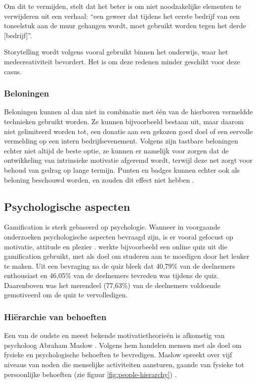 Om dit te vermijden, stelt \textcite{Duster1990} dat het beter is om niet noodzakelijke elementen te verwijderen uit een verhaal: ``een geweer dat tijdens het eerste bedrijf van een toneelstuk aan de muur gehangen wordt, moet gebruikt worden tegen het derde [bedrijf]''.

Storytelling wordt volgens \textcite{Schmoelz2018} vooral gebruikt binnen het onderwijs, waar het medecreativiteit bevordert. Het is om deze redenen minder geschikt voor deze casus.


\subsubsection{Beloningen}
Beloningen kunnen al dan niet in combinatie met één van de hierboven vermeldde technieken gebruikt worden. Ze kunnen bijvoorbeeld bestaan uit, maar daarom niet gelimiteerd worden tot, een donatie aan een gekozen goed doel of een eervolle vermelding op een intern bedrijfsevenement.
Volgens \textcite{Lewis2016} zijn tastbare beloningen echter niet altijd de beste optie, ze kunnen er namelijk voor zorgen dat de ontwikkeling van intrinsieke motivatie afgeremd wordt, terwijl deze net zorgt voor behoud van gedrag op lange termijn. Punten en badges kunnen echter ook als beloning beschouwd worden, en zouden dit effect niet hebben \autocite{Lewis2016}.

\subsection{Psychologische aspecten}
Gamification is sterk gebaseerd op psychologie. Wanneer in voorgaande onderzoeken psychologische aspecten bevraagd zijn, is er vooral gefocust op motivatie, attitude en plezier \autocite{Hamari2014}. \textcite{Cheong2013} werkte bijvoorbeeld een online quiz uit die gamification gebruikt, met als doel om studeren aan te moedigen door het leuker te maken. Uit een bevraging  na de quiz bleek dat 40,79\% van de deelnemers enthousiast en 46,05\% van de deelnemers tevreden was tijdens de quiz. Daarenboven was het merendeel (77,63\%) van de deelnemers voldoende gemotiveerd om de quiz te vervolledigen.

\subsubsection{Hiërarchie van behoeften}
Een van de oudste en meest bekende motivatietheorieën is afkomstig van psycholoog Abraham Maslow \autocite{Richter2014}. Volgens hem handelen mensen met als doel om fysieke en psychologische behoeften te bevredigen. Maslow spreekt over vijf niveaus van noden die menselijke activiteiten aansturen, gaande van fysieke tot persoonlijke behoeften (zie figuur \ref{fig:people-hierarchy}) \autocite{Lilienfeld2014}.

